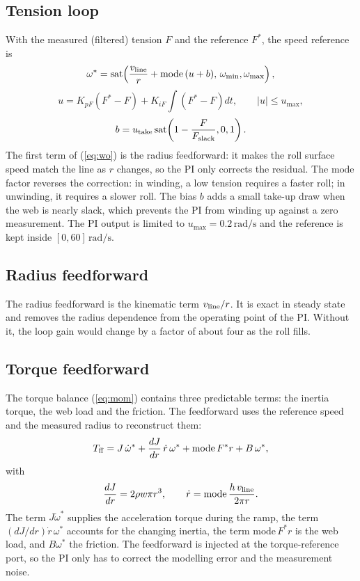 \documentclass[12pt,a4paper,onecolumn]{IEEEtran}
\newcommand{\rads}{\,\mathrm{rad/s}}
\begin{document}
\subsection{Tension loop}
With the measured (filtered) tension $F$ and the reference $F^*$, the speed reference is
\begin{equation}
\omega^*=\operatorname{sat}\!\left(\frac{v_{\rm line}}{r}+\mathrm{mode}\,(u+b),\,\omega_{\min},\omega_{\max}\right), \label{eq:wo}
\end{equation}
\begin{equation}
u=K_{pF}\left(F^*-F\right)+K_{iF}\!\int\!\left(F^*-F\right)dt,\qquad |u|\le u_{\max}, \label{eq:pi}
\end{equation}
\begin{equation}
b=u_{\rm take}\operatorname{sat}\!\left(1-\frac{F}{F_{\rm slack}},0,1\right). \label{eq:bias}
\end{equation}
The first term of (\ref{eq:wo}) is the radius feedforward: it makes the roll surface speed match the line as $r$ changes, so the PI only corrects the residual. The $\mathrm{mode}$ factor reverses the correction: in winding, a low tension requires a faster roll; in unwinding, it requires a slower roll. The bias $b$ adds a small take-up draw when the web is nearly slack, which prevents the PI from winding up against a zero measurement. The PI output is limited to $u_{\max}=0.2\rads$ and the reference is kept inside $[0,60]\rads$.

\subsection{Radius feedforward}
The radius feedforward is the kinematic term $v_{\rm line}/r$. It is exact in steady state and removes the radius dependence from the operating point of the PI. Without it, the loop gain would change by a factor of about four as the roll fills.

\subsection{Torque feedforward}
The torque balance (\ref{eq:mom}) contains three predictable terms: the inertia torque, the web load and the friction. The feedforward uses the reference speed and the measured radius to reconstruct them:
\begin{equation}
T_{\rm ff}=J\,\dot\omega^*+\frac{dJ}{dr}\,\dot r\,\omega^*+\mathrm{mode}\,F^*r+B\,\omega^*, \label{eq:ff}
\end{equation}
with
\begin{equation}
\frac{dJ}{dr}=2\rho w\pi r^3,\qquad \dot r=\mathrm{mode}\,\frac{h\,v_{\rm line}}{2\pi r}. \label{eq:dJ}
\end{equation}
The term $J\dot\omega^*$ supplies the acceleration torque during the ramp, the term $(dJ/dr)\dot r\,\omega^*$ accounts for the changing inertia, the term $\mathrm{mode}\,F^*r$ is the web load, and $B\omega^*$ the friction. The feedforward is injected at the torque-reference port, so the PI only has to correct the modelling error and the measurement noise.
\end{document}
